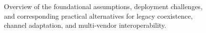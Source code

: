 \documentclass[10pt,twocolumn]{IEEEtran}
\begin{document}
\begin{figure}[t]
    \centering
    {}\vspace{-2mm}
    \caption{Overview of the foundational assumptions, deployment challenges, and corresponding practical alternatives for legacy coexistence, channel adaptation, and multi-vendor interoperability.}\label{fig:overview}\vspace{-3mm}
\end{figure}







\end{document}
